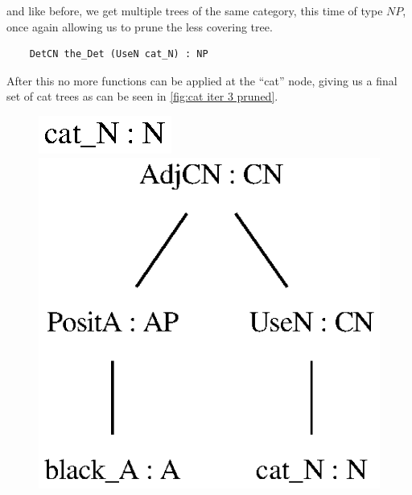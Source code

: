 and like before, we get multiple trees of the same category, this time of type $NP$, once again allowing us to prune the less covering tree.
\begin{lstlisting}
    DetCN the_Det (UseN cat_N) : NP
\end{lstlisting}

After this no more functions can be applied at the ``cat'' node, giving us a final set of cat trees as can be seen in \autoref{fig:cat iter 3 pruned}.

\begin{figure}[H]
    \centering
        {\includegraphics[scale=0.7]{figure/black_cats/cat_N_gf.eps}}
        {\includegraphics[scale=0.7]{figure/black_cats/black_cat_CN_gf.eps}}

\end{figure}

